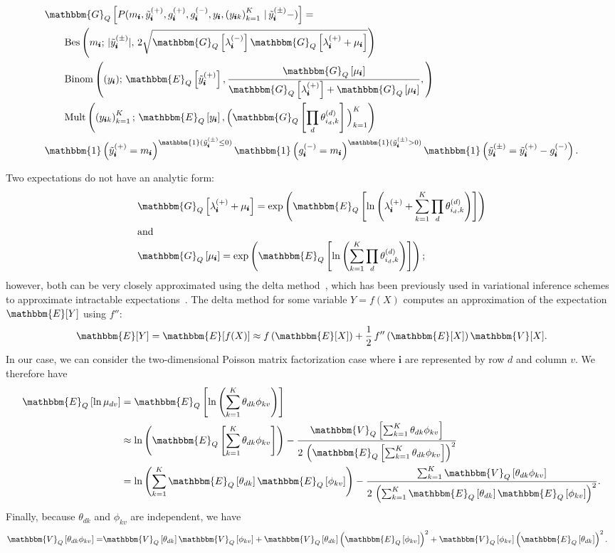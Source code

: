 \documentclass{article}
\newcommand{\subs}{\pmb{i}}
\newcommand{\wsup}[2]{#1_{\subs}^{(#2)}}
\newcommand{\ytP}{\wsup{\tilde{y}}{+}}
\newcommand{\ytPM}{\wsup{\tilde{y}}{\pm}}
\newcommand{\ysk}{y_{\subs k}}
\newcommand{\ys}{y_{\subs}}
\newcommand{\lamP}{\wsup{\lambda}{+}}
\newcommand{\lamM}{\wsup{\lambda}{-}}
\newcommand{\gP}{\wsup{g}{+}}
\newcommand{\gM}{\wsup{g}{-}}
\newcommand{\ms}{m_{\subs}}
\newcommand{\Eq}[1]{\mathbbm{E}_Q\left[#1\right]}
\newcommand{\Vq}[1]{\mathbbm{V}_Q\left[#1\right]}
\newcommand{\Gq}[1]{\mathbbm{G}_Q\left[#1\right]}
\begin{document}
    \begin{align}
  &\Gq{P(\ms, \ytP, \gP, \gM, \ys, \left(\ysk\right)_{k=1}^K \,|\,\ytPM-)} = \notag \\
  &\quad \quad \text{Bes}\left(\ms;\, | \ytPM|,\,2\sqrt{\Gq{\lamM}\Gq{\lamP +\mu_{\subs}}}\right) \notag \\
  &\quad \quad \text{Binom}\left((\ys);\,
  \Eq{\ytP}, \frac{\Gq{\mu_{\subs}}}{\Gq{\lamP} + \Gq{\mu_{\subs}}},
  \right) \notag \\
  &\quad\quad \text{Mult}\left(\left(\ysk\right)_{k=1}^K;\, \Eq{\ys}, \Big(\Gq{ \prod_d \theta_{i_d,k}^{(d)} }\Big)_{k=1}^K\right) \notag \\
  &\mathbbm{1} \left(\ytP=\ms\right)^{\mathbbm{1}(\ytPM \leq 0)} \mathbbm{1} \left(\gM=\ms\right)^{\mathbbm{1}(\ytPM > 0)} \mathbbm{1}\left(\ytPM = \ytP - \gM\right).
  \end{align}
  
  Two expectations do not have an analytic form:
  \begin{align}
  &\Gq{\lamP + \mu_{\subs}} = \exp\left(\Eq{\ln \left(\lamP
    + \sum_{k=1}^K \prod_d \theta_{i_d,k}^{(d)} \right)}\right) \\
  \intertext{and}
  &\Gq{\mu_{\subs}} = \exp\left(\Eq{\ln \left(\sum_{k=1}^K \prod_d \theta_{i_d,k}^{(d)} \right)}\right);
  \end{align}
  however, both can be very closely approximated using the delta
  method~\citep{ver2012invented}, which has been previously used in variational
  inference schemes to approximate intractable
  expectations~\citep{braun2010variational,wang2013variational}. The delta method
  for some variable $Y = f(X)$ computes an approximation of the expectation $\mathbbm{E}[Y]$ using $f''$:
  \begin{equation}
  \mathbbm{E}[Y] = \mathbbm{E}[f(X)] \approx f\left(\mathbbm{E}[X]\right) + \frac{1}{2} \, f''\left(\mathbbm{E}[X]\right) \mathbbm{V}[X].
  \end{equation}
  In our case, we can consider the two-dimensional Poisson matrix factorization
  case where $\subs$ are represented by row $d$ and column $v$. We therefore
  have
  \begin{align}
  \Eq{\ln \mu_{dv}} &= \Eq{\ln\left(\sum_{k=1}^K \theta_{dk}\phi_{kv}\right)} \notag \\
  &\approx \ln\left(\Eq{\sum_{k=1}^K \theta_{dk}\phi_{kv}}\right)
   - \frac{\mathbbm{V}_{Q}\left[\sum_{k=1}^K \theta_{dk} \phi_{kv}\right]}{2 \, \left(\Eq{\sum_{k=1}^K \theta_{dk} \phi_{kv}}\right)^2} \notag \\
  &=\ln\left(\sum_{k=1}^K \Eq{\theta_{dk}}\Eq{\phi_{kv}}\right)
   - \frac{\sum_{k=1}^K \Vq{\theta_{dk} \phi_{kv}}}{2 \, \left(\sum_{k=1}^K \Eq{\theta_{dk}} \Eq{\phi_{kv}}\right)^2}.
  \end{align}
  Finally, because $\theta_{dk}$ and $\phi_{kv}$ are independent, we have
  \begin{align}
  \Vq{\theta_{dk} \phi_{kv}} =& \Vq{\theta_{dk}} \Vq{\phi_{kv}} + \Vq{\theta_{dk}} \left(\Eq{\phi_{kv}}\right)^2 + \Vq{\phi_{kv}} \left(\Eq{\theta_{dk}}\right)^2.
  \end{align}
\end{document}
